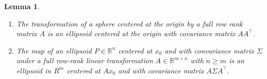 \documentclass[10pt,a4paper]{amsart}
\newtheorem{lemma}{Lemma}
\begin{document}
\begin{lemma}
	\label{lemma:ellipsoid_transformation}
	\begin{enumerate}[label=(\roman*)]
	\item The transformation of a sphere centered at the origin by a full row rank matrix \(A\) is an ellipsoid centered at the origin with covariance matrix \(A A^{\top}\). 
	
	\item The map of an ellipsoid $P \in \mathbb{R}^n$ centered at \(x_0\) and with convariance matrix \(\Sigma\) under a full row-rank linear transformation $A \in \mathbb{R}^{m \times n}$ with $n \geq m$ is an ellipsoid in $R^m$ centered at \(A x_0\) and with covariance matrix \(A \Sigma A^{\top}\).
	\end{enumerate}
\end{lemma}
\end{document}
